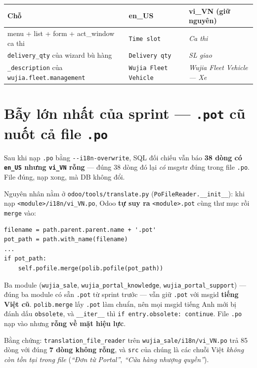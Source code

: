 \begin{center}
\begin{tabular}{p{5.0cm}p{4.0cm}p{4.4cm}}
\hline
\textbf{Chỗ} & \textbf{en\_US} & \textbf{vi\_VN (giữ nguyên)} \\
\hline
menu + list + form + act\_window ca thi & \texttt{Time slot} & \emph{Ca thi} \\
\texttt{delivery\_qty} của wizard bù hàng & \texttt{Delivery qty} & \emph{SL giao} \\
\texttt{\_description} của \texttt{wujia.fleet.management} & \texttt{Wujia Fleet Vehicle} &
  \emph{Wujia Fleet Vehicle --- Xe} \\
\hline
\end{tabular}
\end{center}

\section{Bẫy lớn nhất của sprint --- \texttt{.pot} cũ nuốt cả file \texttt{.po}}

Sau khi nạp \texttt{.po} bằng \texttt{-{}-i18n-overwrite}, SQL đối chiếu vẫn báo \textbf{38 dòng có
\texttt{en\_US} nhưng \texttt{vi\_VN} rỗng} --- đúng 38 dòng đó lại \emph{có} msgstr đúng trong file
\texttt{.po}. File đúng, nạp xong, mà DB không đổi.

Nguyên nhân nằm ở \texttt{odoo/tools/translate.py} (\texttt{PoFileReader.\_\_init\_\_}): khi nạp
\texttt{<module>/i18n/vi\_VN.po}, Odoo \textbf{tự suy ra} \texttt{<module>.pot} cùng thư mục rồi
\texttt{merge} vào:

\begin{lstlisting}[style=python]
filename = path.parent.parent.name + '.pot'
pot_path = path.with_name(filename)
...
if pot_path:
    self.pofile.merge(polib.pofile(pot_path))
\end{lstlisting}

Ba module (\texttt{wujia\_sale}, \texttt{wujia\_portal\_knowledge},
\texttt{wujia\_portal\_support}) --- đúng ba module có sẵn \texttt{.pot} từ sprint trước --- vẫn giữ
\texttt{.pot} với msgid \textbf{tiếng Việt cũ}. \texttt{polib.merge} lấy \texttt{.pot} làm chuẩn, nên
mọi msgid tiếng Anh mới bị đánh dấu \texttt{obsolete}, và \texttt{\_\_iter\_\_} thì
\texttt{if entry.obsolete: continue}. File \texttt{.po} nạp vào nhưng \textbf{rỗng về mặt hiệu lực}.

Bằng chứng: \texttt{translation\_file\_reader} trên \texttt{wujia\_sale/i18n/vi\_VN.po} trả 85 dòng
với đúng \textbf{7 dòng không rỗng}, và \texttt{src} của chúng là các chuỗi Việt \emph{không còn tồn
tại trong file} (\emph{``Đơn từ Portal''}, \emph{``Cửa hàng nhượng quyền''}).

